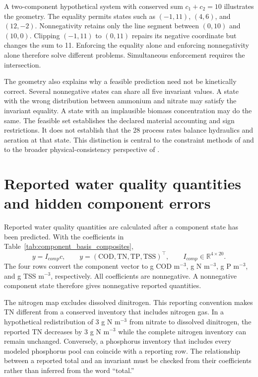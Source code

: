 A two-component hypothetical system with conserved sum $c_1+c_2=10$ illustrates the geometry. The equality permits states such as $(-1,11)$, $(4,6)$, and $(12,-2)$. Nonnegativity retains only the line segment between $(0,10)$ and $(10,0)$. Clipping $(-1,11)$ to $(0,11)$ repairs its negative coordinate but changes the sum to 11. Enforcing the equality alone and enforcing nonnegativity alone therefore solve different problems. Simultaneous enforcement requires the intersection.

The geometry also explains why a feasible prediction need not be kinetically correct. Several nonnegative states can share all five invariant values. A state with the wrong distribution between ammonium and nitrate may satisfy the invariant equality. A state with an implausible biomass concentration may do the same. The feasible set establishes the declared material accounting and sign restrictions. It does not establish that the 28 process rates balance hydraulics and aeration at that state. This distinction is central to the constraint methods of \citet{KircherVotsmeier2025} and to the broader physical-consistency perspective of \citet{Valente2025}.

\section{Reported water quality quantities and hidden component errors}

Reported water quality quantities are calculated after a component state has been predicted. With the coefficients in Table~\ref{tab:component_basis_composites},
\begin{equation}
y=I_{comp}c,\qquad
y=(\mathrm{COD},\mathrm{TN},\mathrm{TP},\mathrm{TSS})^\top,\qquad
I_{comp}\in\mathbb{R}^{4\times20}.
\label{eq:component_composite_map}
\end{equation}
The four rows convert the component vector to g COD m$^{-3}$, g N m$^{-3}$, g P m$^{-3}$, and g TSS m$^{-3}$, respectively. All coefficients are nonnegative. A nonnegative component state therefore gives nonnegative reported quantities.

The nitrogen map excludes dissolved dinitrogen. This reporting convention makes TN different from a conserved inventory that includes nitrogen gas. In a hypothetical redistribution of 3 g N m$^{-3}$ from nitrate to dissolved dinitrogen, the reported TN decreases by 3 g N m$^{-3}$ while the complete nitrogen inventory can remain unchanged. Conversely, a phosphorus inventory that includes every modeled phosphorus pool can coincide with a reporting row. The relationship between a reported total and an invariant must be checked from their coefficients rather than inferred from the word ``total.''

